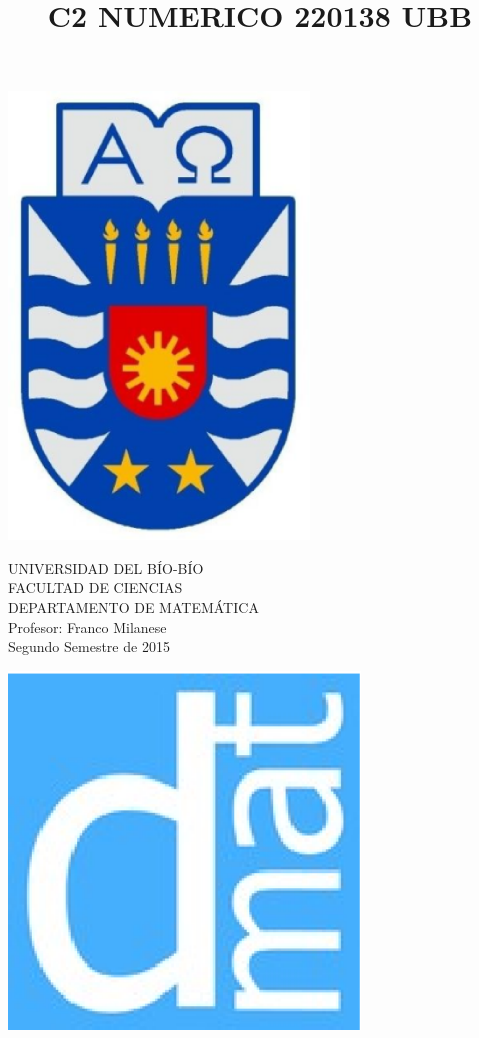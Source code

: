 \documentclass[11pt]{article}
\begin{document}
\title{C2 NUMERICO 220138 UBB}

{\begin{minipage}{2cm}
\hspace*{1cm}\includegraphics[width=0.6\textwidth]{escubo-ubb.eps}
\end{minipage}
\begin{minipage}{12cm}
\small
{\bf \rm 
{
\begin{center}
{\footnotesize UNIVERSIDAD DEL B\'IO-B\'IO} \\
{\scriptsize FACULTAD DE CIENCIAS}  \\
{\scriptsize DEPARTAMENTO DE MATEM\'ATICA}  \\
{\scriptsize Profesor:  Franco Milanese}\\
{\scriptsize Segundo Semestre de 2015}
\end{center}
}}
\end{minipage}}
{\begin{minipage}{2cm}
\hspace*{-0.5cm}\vspace*{-0.05cm}\includegraphics[width=0.7\textwidth]{escudo-dmat.eps}
\end{minipage}}
\end{document}
